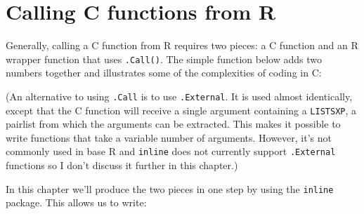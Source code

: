 \hypertarget{calling-c}{%
\section{Calling C functions from R}\label{calling-c}}

Generally, calling a C function from R requires two pieces: a C function
and an R wrapper function that uses \texttt{.Call()}. The simple
function below adds two numbers together and illustrates some of the
complexities of coding in C:

\begin{Shaded}
\begin{Highlighting}[]

\NormalTok{));}
\NormalTok{  REAL(result)[}\NormalTok{] = asReal(a) + asReal(b);}
\NormalTok{);}

\NormalTok{\}}
\end{Highlighting}
\end{Shaded}

\begin{Shaded}
\begin{Highlighting}[]
\StringTok{ }
  \NormalTok{(}
\NormalTok{\}}
\end{Highlighting}
\end{Shaded}

(An alternative to using \texttt{.Call} is to use \texttt{.External}. It
is used almost identically, except that the C function will receive a
single argument containing a \texttt{LISTSXP}, a pairlist from which the
arguments can be extracted. This makes it possible to write functions
that take a variable number of arguments. However, it's not commonly
used in base R and \texttt{inline} does not currently support
\texttt{.External} functions so I don't discuss it further in this
chapter.)  

In this chapter we'll produce the two pieces in one step by using the
\texttt{inline} package. This allows us to write: 

